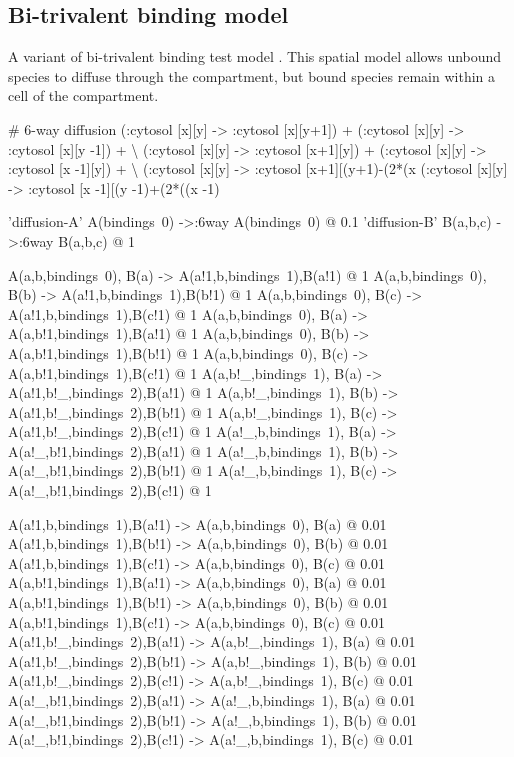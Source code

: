 \subsection{Bi-trivalent binding model}
\label{sec:bitrivalent}


A variant of bi-trivalent binding test model \citep{yang2008kinetic}. This spatial model allows unbound species to diffuse through the compartment, but bound species remain within a cell of the compartment.


\begin{kappasource}


# 6-way diffusion
    (:cytosol [x][y] -> :cytosol [x][y+1]) + (:cytosol [x][y] -> :cytosol [x][y -1]) + {\textbackslash}
    (:cytosol [x][y] -> :cytosol [x+1][y]) + (:cytosol [x][y] -> :cytosol [x -1][y]) + {\textbackslash}
    (:cytosol [x][y] -> :cytosol [x+1][(y+1)-(2*(x%
    (:cytosol [x][y] -> :cytosol [x -1][(y -1)+(2*((x -1)%

'diffusion-A' A(bindings~0) ->:6way A(bindings~0) @ 0.1 
'diffusion-B' B(a,b,c) ->:6way B(a,b,c) @ 1 

A(a,b,bindings~0), B(a) -> A(a!1,b,bindings~1),B(a!1) @ 1
A(a,b,bindings~0), B(b) -> A(a!1,b,bindings~1),B(b!1) @ 1
A(a,b,bindings~0), B(c) -> A(a!1,b,bindings~1),B(c!1) @ 1
A(a,b,bindings~0), B(a) -> A(a,b!1,bindings~1),B(a!1) @ 1
A(a,b,bindings~0), B(b) -> A(a,b!1,bindings~1),B(b!1) @ 1
A(a,b,bindings~0), B(c) -> A(a,b!1,bindings~1),B(c!1) @ 1
A(a,b!_,bindings~1), B(a) -> A(a!1,b!_,bindings~2),B(a!1) @ 1
A(a,b!_,bindings~1), B(b) -> A(a!1,b!_,bindings~2),B(b!1) @ 1
A(a,b!_,bindings~1), B(c) -> A(a!1,b!_,bindings~2),B(c!1) @ 1
A(a!_,b,bindings~1), B(a) -> A(a!_,b!1,bindings~2),B(a!1) @ 1
A(a!_,b,bindings~1), B(b) -> A(a!_,b!1,bindings~2),B(b!1) @ 1
A(a!_,b,bindings~1), B(c) -> A(a!_,b!1,bindings~2),B(c!1) @ 1

A(a!1,b,bindings~1),B(a!1) -> A(a,b,bindings~0), B(a) @ 0.01
A(a!1,b,bindings~1),B(b!1) -> A(a,b,bindings~0), B(b) @ 0.01
A(a!1,b,bindings~1),B(c!1) -> A(a,b,bindings~0), B(c) @ 0.01
A(a,b!1,bindings~1),B(a!1) -> A(a,b,bindings~0), B(a) @ 0.01
A(a,b!1,bindings~1),B(b!1) -> A(a,b,bindings~0), B(b) @ 0.01
A(a,b!1,bindings~1),B(c!1) -> A(a,b,bindings~0), B(c) @ 0.01
A(a!1,b!_,bindings~2),B(a!1) -> A(a,b!_,bindings~1), B(a) @ 0.01
A(a!1,b!_,bindings~2),B(b!1) -> A(a,b!_,bindings~1), B(b) @ 0.01
A(a!1,b!_,bindings~2),B(c!1) -> A(a,b!_,bindings~1), B(c) @ 0.01
A(a!_,b!1,bindings~2),B(a!1) -> A(a!_,b,bindings~1), B(a) @ 0.01
A(a!_,b!1,bindings~2),B(b!1) -> A(a!_,b,bindings~1), B(b) @ 0.01
A(a!_,b!1,bindings~2),B(c!1) -> A(a!_,b,bindings~1), B(c) @ 0.01


\end{kappasource}

